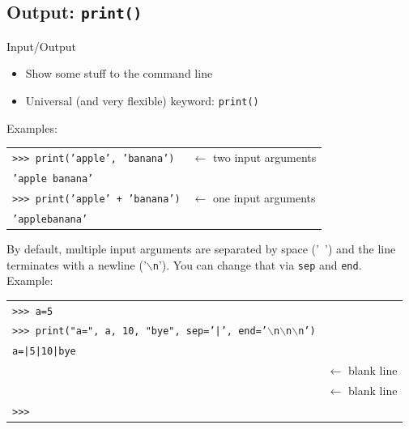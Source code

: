 \documentclass[t,handout,9pt]{beamer}
\begin{document}
\subsection{Output: \texttt{print()}}
\begin{frame}{Input/Output}
\begin{itemize}
	\item Show some stuff to the command line
	\item Universal (and very flexible) keyword: \texttt{print()}
\end{itemize}
Examples:
\begin{table}[]
\begin{tabular}{ll}
\texttt{>{}>{}> print('apple', 'banana')} & $\leftarrow$ two input arguments\\
\texttt{'apple banana'} & \\
\texttt{>{}>{}> print('apple' + 'banana')} & $\leftarrow$ one input arguments\\
\texttt{'applebanana'} & \\
\end{tabular}
\end{table}
By default, multiple input arguments are separated by space ('\texttt{ }') and the line terminates with a newline ('\texttt{$\backslash$n}'). You can change that via \texttt{sep} and \texttt{end}.\\
Example:
\begin{table}[]
\begin{tabular}{ll}
\texttt{>{}>{}> a=5} & \\
\texttt{>{}>{}> print("a=", a, 10, "bye", sep='|', end='$\backslash$n$\backslash$n$\backslash$n')} & \\
\texttt{a=|5|10|bye} & \\
\texttt{} & $\leftarrow$ blank line\\
\texttt{} & $\leftarrow$ blank line\\
\texttt{>{}>{}>} & \\
\end{tabular}
\end{table}
\end{frame}
%
\end{document}

